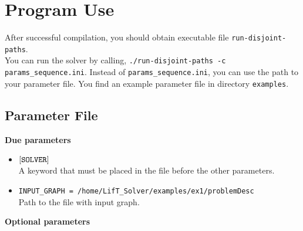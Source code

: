 \documentclass[a4paper,10pt]{article}
\begin{document}
\section{Program Use}\label{sec:programUse}
 

After successful compilation, you should obtain executable file \texttt{run-disjoint-paths}.\\
You can run the solver by calling, \texttt{./run-disjoint-paths -c params\_sequence.ini}. Instead of \texttt{params\_sequence.ini}, you can use the path to your parameter file. You find an example parameter file in directory \texttt{examples}.


\subsection{Parameter File}
\textbf{Due parameters}
\begin{itemize}
 \item  $[\text{\texttt{SOLVER}}]$\\
 A keyword that must be placed in the file before the other parameters.
 \item  \texttt{INPUT\_GRAPH = /home/LifT\_Solver/examples/ex1/problemDesc} \\
 Path to the file with input graph.
 

 

 \end{itemize}
 \textbf{Optional parameters}
\end{document}
